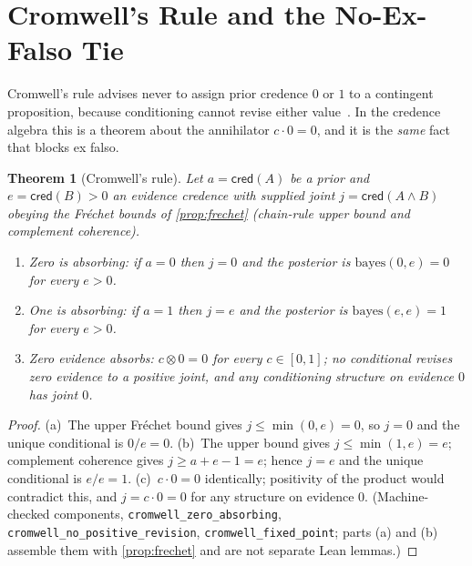 \documentclass[11pt,a4paper]{article}
\newtheorem{theorem}{Theorem}[section]
\newcommand{\cred}{\mathsf{cred}}
\newcommand{\conjc}{\otimes}
\begin{document}
\section{Cromwell's Rule and the No-Ex-Falso Tie}
\label{sec:cromwell}

Cromwell's rule advises never to assign prior credence $0$ or $1$ to a
contingent proposition, because conditioning cannot revise either
value~\cite{jaynes2003}.
In the credence algebra this is a theorem about the annihilator
$c \cdot 0 = 0$, and it is the \emph{same} fact that blocks ex falso.

\begin{theorem}[Cromwell's rule]
\label{thm:cromwell}
Let $a = \cred(A)$ be a prior and $e = \cred(B) > 0$ an evidence
credence with supplied joint $j = \cred(A \land B)$ obeying the
Fr\'echet bounds of \cref{prop:frechet} (chain-rule upper bound and
complement coherence).
\begin{enumerate}[label=\textup{(\alph*)},nosep]
\item \emph{Zero is absorbing:} if $a = 0$ then $j = 0$ and the
  posterior is $\mathrm{bayes}(0, e) = 0$ for every $e > 0$.
\item \emph{One is absorbing:} if $a = 1$ then $j = e$ and the
  posterior is $\mathrm{bayes}(e, e) = 1$ for every $e > 0$.
\item \emph{Zero evidence absorbs:} $c \conjc 0 = 0$ for every
  $c \in [0,1]$; no conditional revises zero evidence to a positive
  joint, and any conditioning structure on evidence $0$ has joint $0$.
\end{enumerate}
\end{theorem}
\begin{proof}
(a)~The upper Fr\'echet bound gives $j \leq \min(0, e) = 0$, so
$j = 0$ and the unique conditional is $0/e = 0$.
(b)~The upper bound gives $j \leq \min(1, e) = e$; complement
coherence gives $j \geq a + e - 1 = e$; hence $j = e$ and the unique
conditional is $e/e = 1$.
(c)~$c \cdot 0 = 0$ identically; positivity of the product would
contradict this, and $j = c \cdot 0 = 0$ for any structure on evidence
$0$.
(Machine-checked components, \texttt{cromwell\_zero\_absorbing},
\texttt{cromwell\_no\_positive\_revision},
\texttt{cromwell\_fixed\_point}; parts (a) and (b) assemble them with
\cref{prop:frechet} and are not separate Lean lemmas.)
\end{proof}
\end{document}
